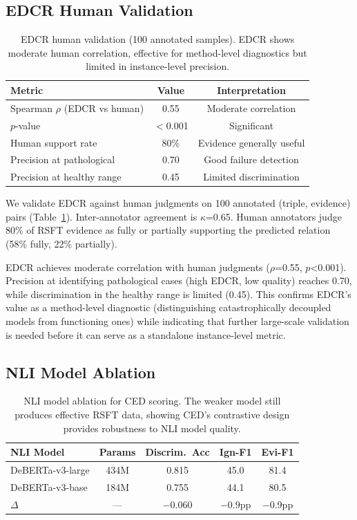 \documentclass[11pt,a4paper]{article}
\begin{document}
\subsection{EDCR Human Validation}

\begin{table}[t]
\centering
\small
\begin{tabular}{lcc}
\toprule
\textbf{Metric} & \textbf{Value} & \textbf{Interpretation} \\
\midrule
Spearman $\rho$ (EDCR vs human) & 0.55 & Moderate correlation \\
$p$-value & $<$0.001 & Significant \\
Human support rate & 80\% & Evidence generally useful \\
Precision at pathological & 0.70 & Good failure detection \\
Precision at healthy range & 0.45 & Limited discrimination \\
\bottomrule
\end{tabular}
\caption{EDCR human validation (100 annotated samples). EDCR shows moderate human correlation, effective for method-level diagnostics but limited in instance-level precision.}
\label{tab:human}
\end{table}

We validate EDCR against human judgments on 100 annotated (triple, evidence) pairs (Table~\ref{tab:human}). Inter-annotator agreement is $\kappa$=0.65. Human annotators judge 80\% of RSFT evidence as fully or partially supporting the predicted relation (58\% fully, 22\% partially).

EDCR achieves moderate correlation with human judgments ($\rho$=0.55, $p$<0.001). Precision at identifying pathological cases (high EDCR, low quality) reaches 0.70, while discrimination in the healthy range is limited (0.45). This confirms EDCR's value as a method-level diagnostic (distinguishing catastrophically decoupled models from functioning ones) while indicating that further large-scale validation is needed before it can serve as a standalone instance-level metric.

\subsection{NLI Model Ablation}

\begin{table}[t]
\centering
\small
\begin{tabular}{lcccc}
\toprule
\textbf{NLI Model} & \textbf{Params} & \textbf{Discrim.\ Acc} & \textbf{Ign-F1} & \textbf{Evi-F1} \\
\midrule
DeBERTa-v3-large & 434M & 0.815 & 45.0 & 81.4 \\
DeBERTa-v3-base & 184M & 0.755 & 44.1 & 80.5 \\
$\Delta$ & --- & $-$0.060 & $-$0.9pp & $-$0.9pp \\
\bottomrule
\end{tabular}
\caption{NLI model ablation for CED scoring. The weaker model still produces effective RSFT data, showing CED's contrastive design provides robustness to NLI model quality.}
\label{tab:nli_ablation}
\end{table}
\end{document}
